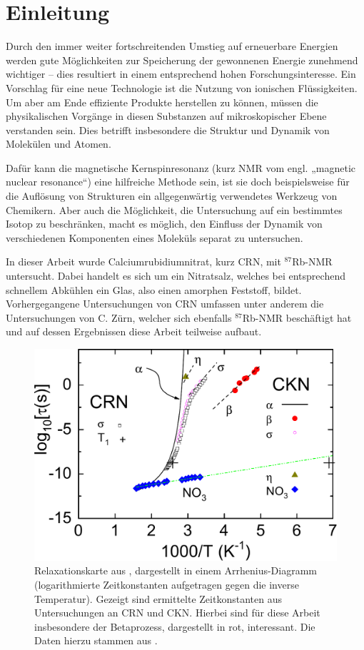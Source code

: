 \chapter{Einleitung}


Durch den immer weiter fortschreitenden Umstieg auf erneuerbare Energien werden gute Möglichkeiten zur Speicherung der gewonnenen Energie zunehmend wichtiger -- dies resultiert in einem entsprechend hohen Forschungsinteresse. Ein Vorschlag für eine neue Technologie ist die Nutzung von ionischen Flüssigkeiten. Um aber am Ende effiziente Produkte herstellen zu können, müssen die physikalischen Vorgänge in diesen Substanzen auf mikroskopischer Ebene verstanden sein. Dies betrifft insbesondere die Struktur und Dynamik von Molekülen und Atomen. 

Dafür kann die magnetische Kernspinresonanz (kurz NMR vom engl. „magnetic nuclear resonance“) eine hilfreiche Methode sein, ist sie doch beispielsweise für die Auflösung von Strukturen ein allgegenwärtig verwendetes Werkzeug von Chemikern. Aber auch die Möglichkeit, die Untersuchung auf ein bestimmtes Isotop zu beschränken, macht es möglich, den Einfluss der Dynamik von verschiedenen Komponenten eines Moleküls separat zu untersuchen.

In dieser Arbeit wurde Calciumrubidiumnitrat, kurz CRN, mit $^\text{87}$Rb-NMR untersucht. Dabei handelt es sich um ein Nitratsalz, welches bei entsprechend schnellem Abkühlen ein Glas, also einen amorphen Feststoff, bildet. Vorhergegangene Untersuchungen von CRN umfassen unter anderem die Untersuchungen von C. Zürn, welcher sich ebenfalls $^\text{87}$Rb-NMR beschäftigt hat \cite{zuern_paper} und auf dessen Ergebnissen diese Arbeit teilweise aufbaut.
\begin{figure}
	\begin{center}
		\includegraphics[width=.7\textwidth]{graphics/zuern/Plot1_b.pdf}
	\end{center}
	\caption{Relaxationskarte aus \cite{zuern_paper}, dargestellt in einem Arrhenius-Diagramm (logarithmierte Zeitkonstanten aufgetragen gegen die inverse Temperatur). Gezeigt sind ermittelte Zeitkonstanten aus Untersuchungen an CRN und CKN. Hierbei sind für diese Arbeit insbesondere der Betaprozess, dargestellt in rot, interessant. Die Daten hierzu stammen aus \cite{***}.} \label{fig:einl:zuernpaper}
\end{figure}

